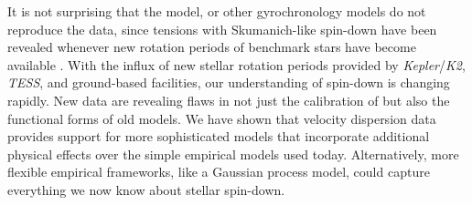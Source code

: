 \documentclass{aastex63}
\newcommand{\eg}{{\it e.g.}}
\newcommand{\kepler}{{\it Kepler}}
\newcommand{\Ktwo}{{\it K2}}
\newcommand{\ktwo}{\Ktwo}
\newcommand{\tess}{{\it TESS}}
\begin{document}
{It is not surprising that the \citet{angus2019} model, or other gyrochronology
models do not reproduce the data, since tensions with Skumanich-like spin-down
have been revealed whenever new rotation periods of benchmark stars have
become available \citep{angus2015, vansaders2016, metcalfe2019, agueros2018,
curtis2019}.
With the influx of new stellar rotation periods provided by \kepler/\ktwo,
\tess, and ground-based facilities, our understanding of spin-down is changing
rapidly.
New data are revealing flaws in not just the calibration of but also the
functional forms of old models.
We have shown that velocity dispersion data provides support for more
sophisticated models that incorporate additional physical effects \citep[\eg,
core-envelope coupling][]{spada2019} over the simple empirical models used
today.
Alternatively, more flexible empirical frameworks, like a Gaussian process
model, could capture everything we now know about stellar spin-down.
}
\end{document}
